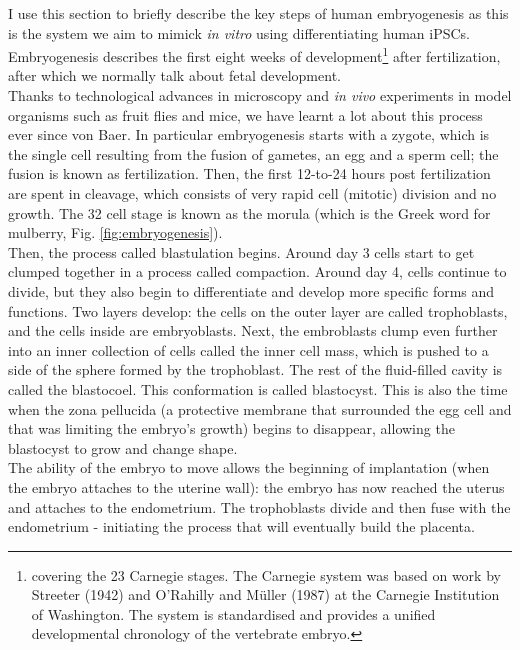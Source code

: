 I use this section to briefly describe the key steps of human embryogenesis as this is the system we aim to mimick \textit{in vitro} using differentiating human iPSCs.
Embryogenesis describes the first eight weeks of development\footnote{covering the 23 Carnegie stages.
The Carnegie system was based on work by Streeter (1942) and O'Rahilly and Müller (1987) at the Carnegie Institution of Washington.
The system is standardised and provides a unified developmental chronology of the vertebrate embryo.} after fertilization, after which we normally talk about fetal development.\\

Thanks to technological advances in microscopy and \textit{in vivo} experiments in model organisms such as fruit flies and mice, we have learnt a lot about this process ever since von Baer.
In particular embryogenesis starts with a zygote, which is the single cell resulting from the fusion of gametes, an egg and a sperm cell; the fusion is known as fertilization.
Then, the first 12-to-24 hours post fertilization are spent in cleavage, which consists of very rapid cell (mitotic) division and no growth.
The 32 cell stage is known as the morula (which is the Greek word for mulberry, Fig. \ref{fig:embryogenesis}).\\

Then, the process called blastulation begins.
Around day 3 cells start to get clumped together in a process called compaction.
Around day 4, cells continue to divide, but they also begin to differentiate and develop more specific forms and functions.
Two layers develop: the cells on the outer layer are called trophoblasts, and the cells inside are embryoblasts. 
Next, the embroblasts clump even further into an inner collection of cells called the inner cell mass, which is pushed to a side of the sphere formed by the trophoblast.
The rest of the fluid-filled cavity is called the blastocoel.
This conformation is called blastocyst.
This is also the time when the zona pellucida (a protective membrane that surrounded the egg cell and that was limiting the embryo's growth) begins to disappear, allowing the blastocyst to grow and change shape.\\

The ability of the embryo to move allows the beginning of implantation (when the embryo attaches to the uterine wall): the embryo has now reached the uterus and attaches to the endometrium.
The trophoblasts divide and then fuse with the endometrium -
initiating the process that
will eventually build the placenta.\\

